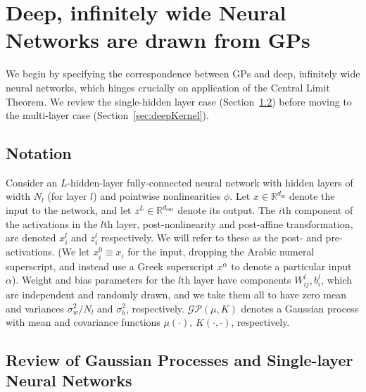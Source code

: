 \documentclass{article} %
\begin{document}
\section{Deep, infinitely wide Neural Networks are drawn from GPs}

We begin by specifying the correspondence between GPs and deep, infinitely wide neural networks, which hinges crucially on application of the Central Limit Theorem. We review the single-hidden layer case (Section~\ref{sec:Correspondence}) before moving to the multi-layer case (Section~\ref{sec:deepKernel}).

\subsection{Notation}
Consider an $L$-hidden-layer fully-connected neural network with hidden layers of width $N_{l}$ (for layer $l$) and pointwise nonlinearities $\phi$. Let $x \in \mathbb{R}^{d_{\text{in}}}$ denote the input to the network, and let $z^{L} \in \mathbb{R}^{d_{\text{out}}}$ denote its output. 
The $i$th component of the activations in the $l$th layer, post-nonlinearity and post-affine transformation, are denoted $x^{l}_i$ and $z^{l}_i$  respectively. We will refer to these as the post- and pre-activations. (We let $x^0_i \equiv x_i$ for the input, dropping the Arabic numeral superscript, and instead use a Greek superscript $x^{\alpha}$ to denote a particular input $\alpha$). Weight and bias parameters for the $l$th layer have components $W^{l}_{ij}, b^{l}_i$, which are independent and randomly drawn, and we take them all to have zero mean and variances $\sigma_w^2/N_l$ and $\sigma_b^2$, respectively. $\mathcal{GP}(\mu, K)$ denotes a Gaussian process with mean and covariance functions $\mu(\cdot),\, K(\cdot, \cdot)$, respectively.


\subsection{Review of Gaussian Processes and Single-layer Neural Networks}
\label{sec:Correspondence}
\end{document}
